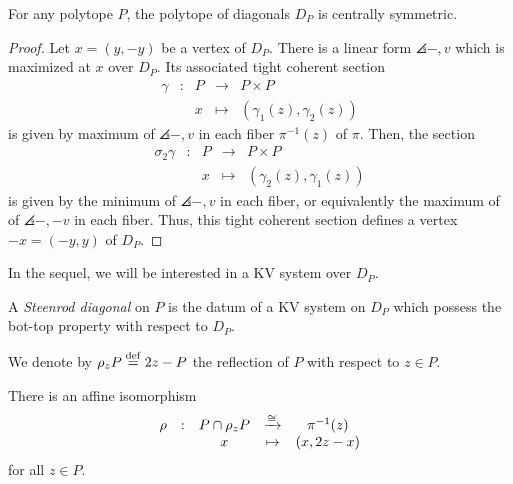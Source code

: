 \begin{proposition}
	For any polytope $P$, the polytope of diagonals $D_P$ is centrally symmetric.
\end{proposition}

\begin{proof}
	Let $x=(y,-y)$ be a vertex of $D_P$.
	There is a linear form $\angles{-,v}$ which is maximized at $x$ over $D_P$.
	Its associated tight coherent section
	\begin{equation*}
		\begin{matrix}
			\gamma & : & P & \to & P \times P \\
			& & x  & \mapsto & (\gamma_1(z),\gamma_2(z))
		\end{matrix}
	\end{equation*}
	is given by maximum of $\angles{-,v}$ in each fiber $\pi^{-1}(z)$ of $\pi$. Then, the section
	\begin{equation*}
		\begin{matrix}
			\sigma_2\gamma & : & P & \to & P \times P \\
			& & x  & \mapsto & (\gamma_2(z),\gamma_1(z))
		\end{matrix}
	\end{equation*}
	is given by the minimum of $\angles{-,v}$ in each fiber, or equivalently the maximum of of $\angles{-,-v}$ in each fiber.
	Thus, this tight coherent section defines a vertex $-x=(-y,y)$ of $D_P$.
\end{proof}

In the sequel, we will be interested in a KV system over $D_P$.

\begin{definition}
	A \emph{Steenrod diagonal} on $P$ is the datum of a KV system on $D_P$ which possess the bot-top property with respect to $D_P$.
\end{definition}

We denote by $\rho_z P \stackrel{\mathrm{def}}{=} 2z-P$ the reflection of $P$ with respect to $z \in P$.

\begin{lemma}
	There is an affine isomorphism
	\begin{equation} \label{eq:iso-intersection}
		\begin{matrix}
			\rho & : & P\cap\rho_z P & \xrightarrow{\cong} & \pi^{-1}(z) \\
			& & x  & \mapsto & (x,2z-x)
		\end{matrix}
	\end{equation}
	for all $z \in P$.
\end{lemma}

